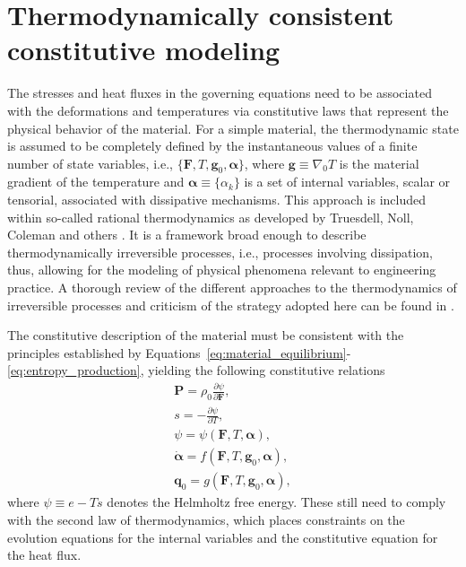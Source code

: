 \section{Thermodynamically consistent constitutive modeling} \label{sec:constitutive_modeling}
The stresses and heat fluxes in the governing equations need to be associated with the deformations and temperatures via constitutive laws that represent the physical behavior of the material.
For a simple material, the thermodynamic state is assumed to be completely defined by the instantaneous values of a finite number of state variables, i.e., \(\{\bm{F}, T, \bm{g}_0, \bm{\alpha}\}\), where $\bm g \equiv \nabla_0 T$ is the material gradient of the temperature and \(\bm{\alpha} \equiv \{\alpha_k\}\) is a set of internal variables, scalar or tensorial, associated with dissipative mechanisms.
This approach is included within so-called rational thermodynamics as developed by Truesdell, Noll, Coleman and others \citep{nollMathematicalTheoryMechanical1958, colemanFoundationsLinearViscoelasticity1961, colemanExistenceCaloricEquations1964}.
It is a framework broad enough to describe thermodynamically irreversible processes, i.e., processes involving dissipation, thus, allowing for the modeling of physical phenomena relevant to engineering practice.
A thorough review of the different approaches to the thermodynamics of irreversible processes and criticism of the strategy adopted here can be found in \cite{lavenda1978thermodynamics}.

The constitutive description of the material must be consistent with the principles established by Equations~\eqref{eq:material_equilibrium}-\eqref{eq:entropy_production}, yielding the following constitutive relations
\begin{gather}
  \bm{P} = \rho_0 \frac{\partial \psi}{\partial \bm{F}},\label{eq:constitutive_equation_stress_thermoelasticity}\\
  s = - \frac{\partial \psi}{\partial T},\\
  \psi = \psi(\bm{F},T, \bm{\alpha}),\label{eq:thermo_mech_helmholtz_free_energy}\\
  \dot{\bm{\alpha}} = f(\bm{F}, T, \bm{g}_0,\bm{\alpha}),\\
  \bm{q}_0 = g(\bm{F}, T, \bm{g}_0, \bm{\alpha}),
\end{gather}
where \(\psi \equiv e - T s\) denotes the Helmholtz free energy.
These still need to comply with the second law of thermodynamics, which places constraints on the evolution equations for the internal variables and the constitutive equation for the heat flux.

